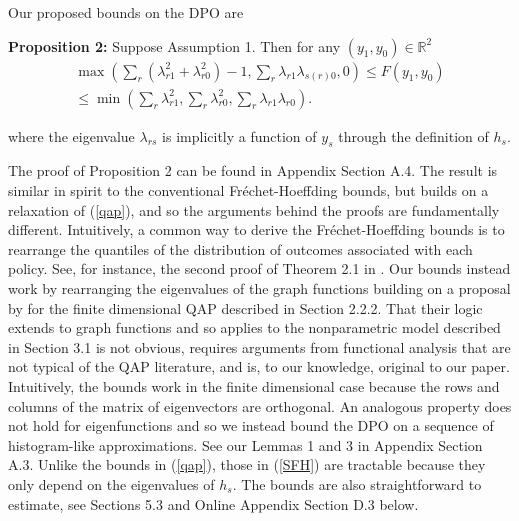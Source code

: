 \documentclass[12pt]{article}
\theoremstyle{definition}
\begin{document}
Our proposed bounds on the DPO are   
\begin{flushleft}
\textbf{Proposition 2:} Suppose Assumption 1. Then for any $(y_{1},y_{0}) \in \mathbb{R}^{2}$
\begin{align}\label{SFH}
\max\left(\sum_{r}\left(\lambda_{r1}^{2} + \lambda_{r0}^{2}\right) - 1,\sum_{r}\lambda_{r1}\lambda_{s(r)0},0\right)
\leq F(y_{1},y_{0})  \nonumber \\
\leq \min\left(\sum_{r}\lambda_{r1}^{2},\sum_{r}\lambda_{r0}^{2},\sum_{r}\lambda_{r1}\lambda_{r0}\right).
\end{align} 
\end{flushleft}
where the eigenvalue $\lambda_{rs}$ is implicitly a function of $y_{s}$ through the definition of $h_{s}$.

The proof of Proposition 2 can be found in Appendix Section A.4. The result is similar in spirit to the conventional Fr\'echet-Hoeffding bounds, but builds on a relaxation of (\ref{qap}), and so the arguments behind the proofs are fundamentally different. Intuitively, a common way to derive the Fr\'echet-Hoeffding bounds is to rearrange the quantiles of the distribution of outcomes associated with each policy. See, for instance, the second proof of Theorem 2.1 in \cite{whitt1976bivariate}. Our bounds instead work by rearranging the eigenvalues of the graph functions building on a proposal by \cite{finke1987quadratic} for the finite dimensional QAP described in Section 2.2.2. That their logic extends to graph functions and so applies to the nonparametric model described in Section 3.1 is  not obvious, requires arguments from functional analysis that are not typical of the QAP literature, and is,  to our knowledge, original to our paper. Intuitively, the \cite{finke1987quadratic} bounds work in the finite dimensional case because the rows and columns of the matrix of eigenvectors are orthogonal.  An analogous property does not hold for eigenfunctions and so we instead bound the DPO on a sequence of histogram-like approximations. See our Lemmas 1 and 3 in Appendix Section A.3. Unlike the bounds in  (\ref{qap}), those in  (\ref{SFH}) are tractable because they only depend on the eigenvalues of $h_{s}$. The bounds are also straightforward to estimate, see Sections 5.3 and Online Appendix Section D.3 below.  
\end{document}
